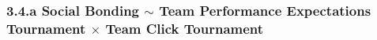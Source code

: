 

%

%




\subsubsection{3.4.a Social Bonding $\sim$ Team Performance Expectations Tournament $\times$ Team Click Tournament}


